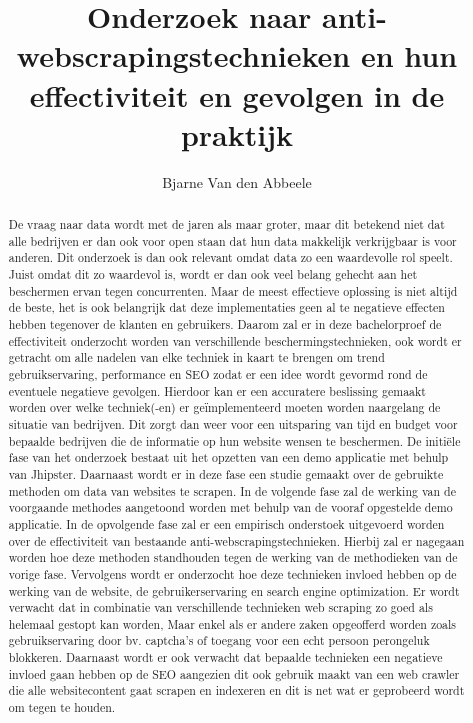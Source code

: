 \documentclass{hogent-article}
\title{Onderzoek naar anti-webscrapingstechnieken en hun effectiviteit en gevolgen in de praktijk}
\author{Bjarne Van den Abbeele}
\begin{document}
\begin{abstract}
De vraag naar data wordt met de jaren als maar groter, maar dit betekend niet dat alle bedrijven er dan ook voor open staan dat hun data makkelijk verkrijgbaar is voor anderen. Dit onderzoek is dan ook relevant omdat data zo een waardevolle rol speelt. Juist omdat dit zo waardevol is, wordt er dan ook veel belang gehecht aan het beschermen ervan tegen concurrenten. Maar de meest effectieve oplossing is niet altijd de beste, het is ook belangrijk dat deze implementaties geen al te negatieve effecten hebben tegenover de klanten en gebruikers. 
\newline
Daarom zal er in deze bachelorproef de effectiviteit onderzocht worden van verschillende beschermingstechnieken, ook wordt er getracht om alle nadelen van elke techniek in kaart te brengen om trend gebruikservaring, performance en SEO  zodat er een idee wordt gevormd rond de eventuele negatieve gevolgen. Hierdoor kan er een accuratere beslissing gemaakt worden over welke techniek(-en) er geïmplementeerd moeten worden naargelang de situatie van bedrijven. Dit zorgt dan weer voor een uitsparing van tijd en budget voor bepaalde bedrijven die de informatie op hun website wensen te beschermen.
 \newline 
\newline
De initiële fase van het onderzoek bestaat uit het opzetten van een demo applicatie met behulp van Jhipster. Daarnaast wordt er in deze fase een studie gemaakt over de gebruikte methoden om data van websites te scrapen. 
In de volgende fase zal de werking van de voorgaande methodes aangetoond worden met behulp van de vooraf opgestelde demo applicatie.
In de opvolgende fase zal er een empirisch onderstoek uitgevoerd worden over de effectiviteit van bestaande anti-webscrapingstechnieken. Hierbij zal er nagegaan worden hoe deze methoden standhouden tegen de werking van de methodieken van de vorige fase.
Vervolgens wordt er onderzocht hoe deze technieken invloed hebben op de werking van de website, de gebruikerservaring en search engine optimization.
\newline
Er wordt verwacht dat in combinatie van verschillende technieken web scraping zo goed als helemaal gestopt kan worden, Maar enkel als er andere zaken opgeofferd worden zoals gebruikservaring door bv. captcha's of toegang voor een echt persoon perongeluk blokkeren. Daarnaast wordt er ook verwacht dat bepaalde technieken een negatieve invloed gaan hebben op de SEO aangezien dit ook gebruik maakt van een web crawler die alle websitecontent gaat scrapen en indexeren en dit is net wat er geprobeerd wordt om tegen te houden.


\end{abstract}

\tableofcontents



\printbibliography[heading=bibintoc]
\end{document}

